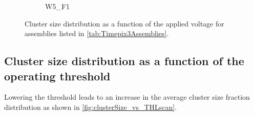 \begin{figure}[htbp]
\begin{subfigure}[b]{0.33\textwidth}
    \caption{W5\_F1}
  \end{subfigure}%
  \caption{Cluster size distribution as a function of the applied
    voltage for assemblies listed in \cref{tab:Timepix3Assemblies}.}
  \label{fig:clusterSize_vs_biasVoltage}
\end{figure}

\subsection{Cluster size distribution as a function of the operating
  threshold}

Lowering the threshold leads to an increase in the average cluster
size fraction distribution as shown in
\cref{fig:clusterSize_vs_THLscan}.

